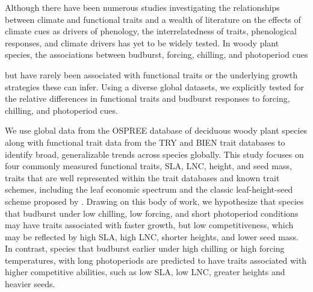 \documentclass{article}\usepackage[]{graphicx}\usepackage[]{color}
\begin{document}
Although there have been numerous studies investigating the relationships between climate and functional traits and a wealth of literature on the effects of climate cues as drivers of phenology, the interrelatedness of traits, phenological responses, and climate drivers has yet to be widely tested. In woody plant species, the associations between budburst, forcing, chilling, and photoperiod cues

 but have rarely been associated with functional traits or the underlying growth strategies these can infer.  Using a diverse global datasets, we explicitly tested for the relative differences in functional traits and budburst responses to forcing, chilling, and photoperiod cues.  

We use global data from the OSPREE database of deciduous woody plant species along with functional trait data from the TRY and BIEN trait databases to identify broad, generalizable trends across species globally. This study focuses on four commonly measured functional traits, SLA, LNC, height, and seed mass, traits that are well represented within the trait databases and known trait schemes, including the leaf economic spectrum \citep{Wright2004} and the classic leaf-height-seed scheme proposed by \cite{Westoby1998}. Drawing on this body of work, we hypothesize that species that budburst under low chilling, low forcing, and short photoperiod conditions may have traits associated with faster growth, but low competitiveness, which may be reflected by high SLA, high LNC, shorter heights, and lower seed mass. In contrast, species that budburst earlier under high chilling or high forcing temperatures, with long photoperiods are predicted to have traits associated with higher competitive abilities, such as low SLA, low LNC, greater heights and heavier seeds. 

\pagebreak
% 

\end{document}
